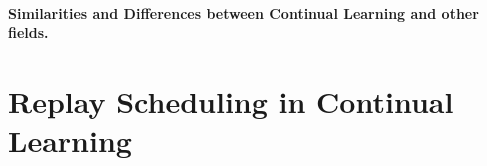 




\paragraph{Similarities and Differences between Continual Learning and other fields.} 

\section{Replay Scheduling in Continual Learning}\label{sec:replay_scheduling_in_cl}


